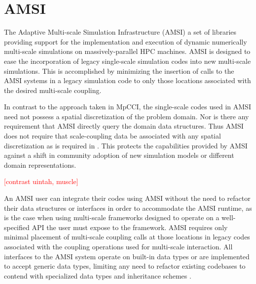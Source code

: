 \documentclass[review]{siamart1116}
\newcommand{\red}[1]{\textcolor{red}{[#1]}}
\begin{document}

\section{AMSI}\label{sec:amsi}


The Adaptive Multi-scale Simulation Infrastructure (AMSI) a set of libraries providing support for the implementation and execution of dynamic numerically multi-scale simulations on massively-parallel HPC machines.  AMSI is designed to ease the incorporation of legacy single-scale simulation codes into new multi-scale simulations. This is accomplished by minimizing the insertion of calls to the AMSI systems in a legacy simulation code to only those locations associated with the desired multi-scale coupling. 

In contrast to the approach taken in MpCCI, the single-scale codes used in AMSI need not possess a spatial discretization of the problem domain. Nor is there any requirement that AMSI directly query the domain data structures. Thus AMSI does not require that scale-coupling data be associated with any spatial discretization as is required in \cite{joppich2006mpcci}. This protects the capabilities provided by AMSI against a shift in community adoption of new simulation models or different domain representations.

\red{contrast uintah, muscle}

An AMSI user can integrate their codes using AMSI without the need to refactor their data structures or interfaces in order to accommodate the AMSI runtime, as is the case when using multi-scale frameworks designed to operate on a well-specified API the user must expose to the framework. AMSI requires only minimal placement of multi-scale coupling calls at those locations in legacy codes associated with the coupling operations used for multi-scale interaction. All interfaces to the AMSI system operate on built-in data types or are implemented to accept generic data types, limiting any need to refactor existing codebases to contend with specialized data types and inheritance schemes \cite{plimpton2013developing}. 
\end{document}
